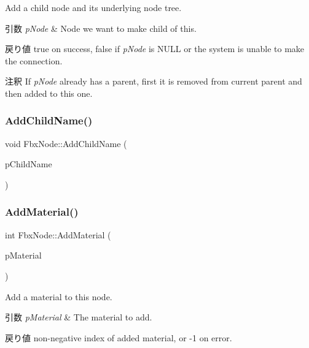 Add a child node and its underlying node tree. 
\begin{DoxyParams}{引数}
{\em p\+Node} & Node we want to make child of {\ttfamily this}. \\
\hline
\end{DoxyParams}
\begin{DoxyReturn}{戻り値}
{\ttfamily true} on success, {\ttfamily false} if {\itshape p\+Node} is {\ttfamily N\+U\+LL} or the system is unable to make the connection. 
\end{DoxyReturn}
\begin{DoxyRemark}{注釈}
If {\itshape p\+Node} already has a parent, first it is removed from current parent and then added to this one. 
\end{DoxyRemark}
\mbox{\label{class_fbx_node_a0b5b1e8cbd19f97a56f3641858d64a61}} 
\subsubsection{\texorpdfstring{Add\+Child\+Name()}{AddChildName()}}
{\footnotesize\ttfamily void Fbx\+Node\+::\+Add\+Child\+Name (\begin{DoxyParamCaption}\item[{char $\ast$}]{p\+Child\+Name }\end{DoxyParamCaption})}

\mbox{\label{class_fbx_node_a6f28c5ed116319e03d31a21e897b6dad}} 
\subsubsection{\texorpdfstring{Add\+Material()}{AddMaterial()}}
{\footnotesize\ttfamily int Fbx\+Node\+::\+Add\+Material (\begin{DoxyParamCaption}\item[{\hyperlink{class_fbx_surface_material}{Fbx\+Surface\+Material} $\ast$}]{p\+Material }\end{DoxyParamCaption})}

Add a material to this node. 
\begin{DoxyParams}{引数}
{\em p\+Material} & The material to add. \\
\hline
\end{DoxyParams}
\begin{DoxyReturn}{戻り値}
non-\/negative index of added material, or -\/1 on error. 
\end{DoxyReturn}
\mbox{\label{class_fbx_node_afae7fc1a08dd48e8fa9e768ec5776f08}} 
